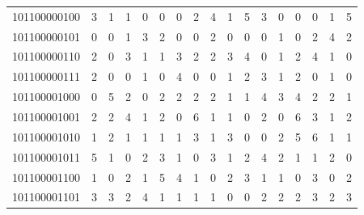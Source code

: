 \documentclass[10pt,a4paper]{article}
\begin{document}
\begin{longtable}{ |c|c|c|c|c|c|c|c|c|c|c|c|c|c|c|c|c| }
    101100000100              & 3                            & 1                                & 1                            & 0                              & 0   & 0   & 2   & 4   & 1   & 5   & 3   & 0   & 0   & 0   & 1   & 5   \\
    101100000101              & 0                            & 0                                & 1                            & 3                              & 2   & 0   & 0   & 2   & 0   & 0   & 0   & 1   & 0   & 2   & 4   & 2   \\
    101100000110              & 2                            & 0                                & 3                            & 1                              & 1   & 3   & 2   & 2   & 3   & 4   & 0   & 1   & 2   & 4   & 1   & 0   \\
    101100000111              & 2                            & 0                                & 0                            & 1                              & 0   & 4   & 0   & 0   & 1   & 2   & 3   & 1   & 2   & 0   & 1   & 0   \\
    101100001000              & 0                            & 5                                & 2                            & 0                              & 2   & 2   & 2   & 2   & 1   & 1   & 4   & 3   & 4   & 2   & 2   & 1   \\
    101100001001              & 2                            & 2                                & 4                            & 1                              & 2   & 0   & 6   & 1   & 1   & 0   & 2   & 0   & 6   & 3   & 1   & 2   \\
    101100001010              & 1                            & 2                                & 1                            & 1                              & 1   & 1   & 3   & 1   & 3   & 0   & 0   & 2   & 5   & 6   & 1   & 1   \\
    101100001011              & 5                            & 1                                & 0                            & 2                              & 3   & 1   & 0   & 3   & 1   & 2   & 4   & 2   & 1   & 1   & 2   & 0   \\
    101100001100              & 1                            & 0                                & 2                            & 1                              & 5   & 4   & 1   & 0   & 2   & 3   & 1   & 1   & 0   & 3   & 0   & 2   \\
    101100001101              & 3                            & 3                                & 2                            & 4                              & 1   & 1   & 1   & 1   & 0   & 0   & 2   & 2   & 2   & 3   & 2   & 3   \\

\end{longtable}
\end{document}

